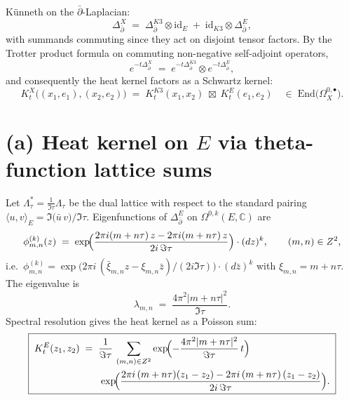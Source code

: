 \documentclass[11pt]{amsart}
\providecommand{\dbar}{\bar\partial}
\providecommand{\C}{\mathbb{C}}
\providecommand{\Z}{\mathbb{Z}}
\theoremstyle{definition}
\theoremstyle{remark}
\begin{document}
K\"unneth on the $\dbar$-Laplacian:
\begin{equation}
  \label{eq:laplacian-kunneth}
  \Delta_{\dbar}^X
  \;=\; \Delta_{\dbar}^{K3} \otimes \mathrm{id}_E
  \;+\; \mathrm{id}_{K3} \otimes \Delta_{\dbar}^E,
\end{equation}
with summands commuting since they act on disjoint tensor factors.
By the Trotter product formula on commuting non-negative self-adjoint
operators,
\begin{equation}
  \label{eq:heat-kernel-kunneth}
  e^{-t\Delta_{\dbar}^X}
  \;=\;
  e^{-t\Delta_{\dbar}^{K3}} \otimes e^{-t\Delta_{\dbar}^E},
\end{equation}
and consequently the heat kernel factors as a Schwartz kernel:
\begin{equation}
  \label{eq:heat-kernel-factorisation}
  K^X_t\bigl((x_1,e_1),(x_2,e_2)\bigr)
  \;=\;
  K^{K3}_t(x_1,x_2)\;\boxtimes\;K^E_t(e_1,e_2)
  \quad \in \;
  \mathrm{End}\bigl(\Omega^{0,\bullet}_X\bigr).
\end{equation}

\section{(a) Heat kernel on $E$ via theta-function lattice sums}
\label{sec:heat-E}

Let $\Lambda_\tau^* = \frac{1}{\Im\tau}\Lambda_\tau$ be the dual
lattice with respect to the standard pairing
$\langle u, v\rangle_E = \Im\bigl(\bar u\,v\bigr)/\Im\tau$.
Eigenfunctions of $\Delta_{\dbar}^E$ on
$\Omega^{0,k}(E,\C)$ are
\[
  \phi_{m,n}^{(k)}(z) \;=\;
  \exp\!\Bigl(\frac{2\pi i (m + n\tau)\,\bar z - 2\pi i (m + n\bar\tau)\, z}
                  {2 i\,\Im\tau}\Bigr) \cdot (d\bar z)^k,
  \qquad (m,n) \in \Z^2,
\]
i.e.\ $\phi_{m,n}^{(k)} = \exp\!\bigl(2\pi i\,(\bar\xi_{m,n} z - \xi_{m,n} \bar z)/(2i\Im\tau)\bigr)\cdot (d\bar z)^k$ with
$\xi_{m,n} = m + n\tau$. The eigenvalue is
\[
  \lambda_{m,n} \;=\; \frac{4\pi^2 |m + n\tau|^2}{\Im\tau}.
\]
Spectral resolution gives the heat kernel as a Poisson sum:
\begin{equation}
  \label{eq:heat-E-explicit}
  \boxed{\;
  \begin{aligned}
  K^E_t(z_1,z_2)
  &\;=\;
  \frac{1}{\Im\tau}\,
  \sum_{(m,n)\in\Z^2}
  \exp\!\Bigl(-\frac{4\pi^2 |m+n\tau|^2}{\Im\tau}\,t\Bigr)\,\\
  &\qquad\exp\!\Bigl(\frac{2\pi i\,(m+n\tau)(z_1 - z_2) - 2\pi i\,\overline{(m+n\tau)}\,(\bar z_1 - \bar z_2)}{2 i\,\Im\tau}\Bigr).
  \end{aligned}
  \;}
\end{equation}
\end{document}
